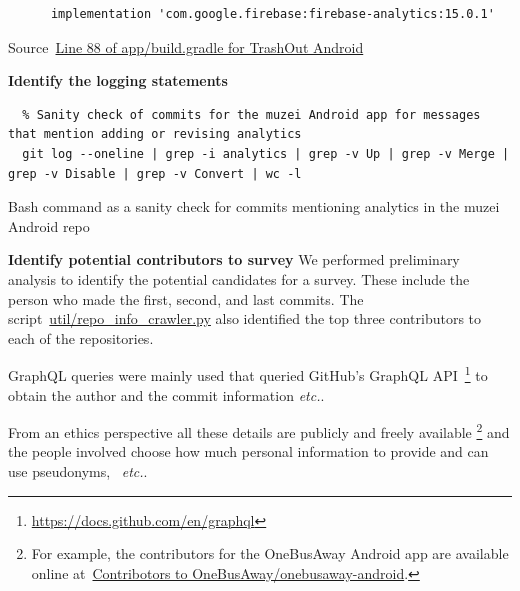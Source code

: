 \begin{listing}
\begin{verbatim}
      implementation 'com.google.firebase:firebase-analytics:15.0.1'
\end{verbatim}
\caption{Source~\href{https://github.com/TrashOut/Android/blob/e897c1c05629f3f5da23516fdfbd24870f773166/app/build.gradle\#L88}{Line 88 of app/build.gradle for TrashOut Android}}
\label{listing:trashout_ancient_firebaseanalytics_version}
\end{listing}

\textbf{Identify the logging statements}

\begin{listing}
\begin{verbatim}
  % Sanity check of commits for the muzei Android app for messages that mention adding or revising analytics
  git log --oneline | grep -i analytics | grep -v Up | grep -v Merge | grep -v Disable | grep -v Convert | wc -l
\end{verbatim}
\caption{Bash command as a sanity check for commits mentioning analytics in the muzei Android repo}
\label{listing:sanity_check_muzei_android_commits}
\end{listing}


\textbf{Identify potential contributors to survey}
We performed preliminary analysis to identify the potential candidates for a survey. These include the person who made the first, second, and last commits. The script~\href{https://github.com/mobileanalyticslogs/mobileanalyticslogging/blob/76569d59f0ea6f49f9549433d24ae59dda7fedfd/util/repo\_info\_crawler.py}{util/repo\_info\_crawler.py} also identified the top three contributors to each of the repositories. 

GraphQL queries were mainly used that queried GitHub's GraphQL API~\footnote{\url{https://docs.github.com/en/graphql}} to obtain the author and the commit information \textit{etc.}. 

From an ethics perspective all these details are publicly and freely available \footnote{For example, the contributors for the OneBusAway Android app are available online at~\href{https://github.com/OneBusAway/onebusaway-android/graphs/contributors}{Contribotors to OneBusAway/onebusaway-android}.} and the people involved choose how much personal information to provide and can use pseudonyms, ~\emph{etc.}.

